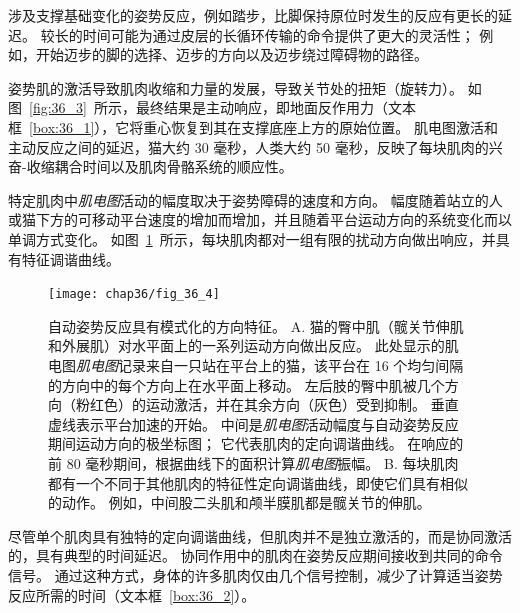涉及支撑基础变化的姿势反应，例如踏步，比脚保持原位时发生的反应有更长的延迟。
较长的时间可能为通过皮层的长循环传输的命令提供了更大的灵活性；
例如，开始迈步的脚的选择、迈步的方向以及迈步绕过障碍物的路径。


姿势肌的激活导致肌肉收缩和力量的发展，导致关节处的扭矩（旋转力）。
如图~\ref{fig:36_3}~所示，最终结果是主动响应，即地面反作用力（文本框~\ref{box:36_1}），它将重心恢复到其在支撑底座上方的原始位置。
肌电图激活和主动反应之间的延迟，猫大约 30 毫秒，人类大约 50 毫秒，反映了每块肌肉的兴奋-收缩耦合时间以及肌肉骨骼系统的顺应性。


特定肌肉中\textit{肌电图}活动的幅度取决于姿势障碍的速度和方向。
幅度随着站立的人或猫下方的可移动平台速度的增加而增加，并且随着平台运动方向的系统变化而以单调方式变化。
如图~\ref{fig:36_4}~所示，每块肌肉都对一组有限的扰动方向做出响应，并具有特征调谐曲线。



\begin{figure}[htbp]
	\centering
	\texttt{[image: chap36/fig\_36\_4]}
	\caption{自动姿势反应具有模式化的方向特征\cite{macpherson1988strategies}。
		A. 猫的臀中肌（髋关节伸肌和外展肌）对水平面上的一系列运动方向做出反应。
		此处显示的肌电图\textit{肌电图}记录来自一只站在平台上的猫，该平台在 16 个均匀间隔的方向中的每个方向上在水平面上移动。 
		左后肢的臀中肌被几个方向（粉红色）的运动激活，并在其余方向（灰色）受到抑制。 
		垂直虚线表示平台加速的开始。 
		中间是\textit{肌电图}活动幅度与自动姿势反应期间运动方向的极坐标图；
		它代表肌肉的定向调谐曲线。
		在响应的前 80 毫秒期间，根据曲线下的面积计算\textit{肌电图}振幅。 
		B. 每块肌肉都有一个不同于其他肌肉的特征性定向调谐曲线，即使它们具有相似的动作。
		例如，中间股二头肌和颅半膜肌都是髋关节的伸肌。}
	\label{fig:36_4}
\end{figure}


尽管单个肌肉具有独特的定向调谐曲线，但肌肉并不是独立激活的，而是协同激活的，具有典型的时间延迟。
协同作用中的肌肉在姿势反应期间接收到共同的命令信号。
通过这种方式，身体的许多肌肉仅由几个信号控制，减少了计算适当姿势反应所需的时间（文本框~\ref{box:36_2}）。


